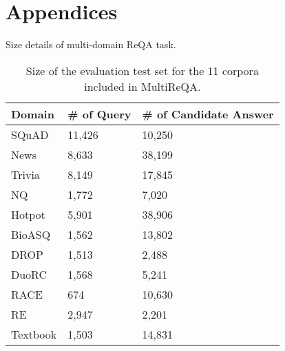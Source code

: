 \documentclass[11pt,a4paper]{article}
\begin{document}
\section{Appendices}
\label{sec:appendix}
Size details of multi-domain ReQA task.
\begin{table}[ht]
\small
\centering
\begin{tabular}{p{}|p{}p{}} \hline
\textbf{Domain}                        & \textbf{\# of Query}  & \textbf{\# of Candidate Answer} \\ \hline
SQuAD         & 11,426  & 10,250                    \\
News          & 8,633        &38,199               \\
Trivia          & 8,149  & 17,845                        \\
NQ       & 1,772  &  7,020                \\
Hotpot          & 5,901      & 38,906                 \\ 
BioASQ   & 1,562  & 13,802                  \\
DROP                  & 1,513  & 2,488                       \\
DuoRC          & 1,568  & 5,241                  \\
RACE                  & 674  & 10,630                   \\
RE                   & 2,947  & 2,201                       \\
Textbook          &  1,503  & 14,831                  \\ \hline
\end{tabular}
\caption{Size of the evaluation test set for the 11 corpora included in MultiReQA.}
\label{tbl:reqa_size}
\end{table}
\end{document}
